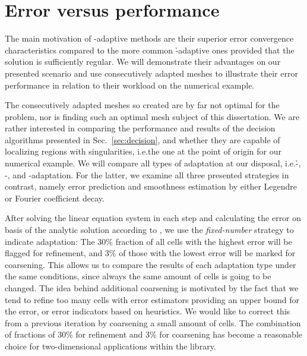 \section{Error versus performance}
\label{sec:errorvsperformance}



The main motivation of \hp-adaptive methods are their superior error convergence characteristics compared to the more common \h-adaptive ones provided that the solution is sufficiently regular. We will demonstrate their advantages on our presented scenario and use consecutively adapted meshes to illustrate their error performance in relation to their workload on the numerical example.


The consecutively adapted meshes so created are by far not optimal for the problem, nor is finding such an optimal mesh subject of this dissertation. We are rather interested in comparing the performance and results of the decision algorithms presented in Sec.~\ref{sec:decision}, and whether they are capable of localizing regions with singularities, i.e.\@ the one at the point of origin for our numerical example. We will compare all types of adaptation at our disposal, i.e.\@ \h-, \p-, and \hp-adaptation. For the latter, we examine all three presented strategies in contrast, namely error prediction and smoothness estimation by either Legendre or Fourier coefficient decay.

After solving the linear equation system in each step and calculating the error on basis of the analytic solution according to \textcite{kelly1983}, we use the \textit{fixed-number}  strategy to indicate adaptation: The 30\% fraction of all cells with the highest error will be flagged for refinement, and 3\% of those with the lowest error will be marked for coarsening. This allows us to compare the results of each adaptation type under the same conditions, since always the same amount of cells is going to be changed. The idea behind additional coarsening is motivated by the fact that we tend to refine too many cells with error estimators providing an upper bound for the error, or error indicators based on heuristics. We would like to correct this from a previous iteration by coarsening a small amount of cells. The combination of fractions of 30\% for refinement and 3\% for coarsening has become a reasonable choice for two-dimensional applications within the \dealii{} library.

